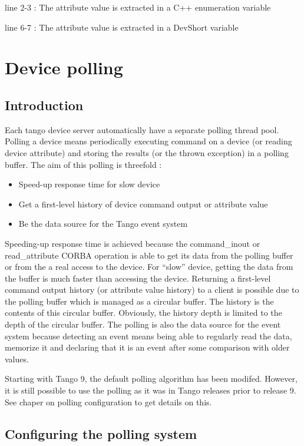 line 2-3 : The attribute value is extracted in a C++ enumeration variable

line 6-7 : The attribute value is extracted in a DevShort variable


\section{Device polling}


\subsection{Introduction}

Each tango device server automatically have a separate polling
thread pool. Polling a device means periodically executing command
on a device (or reading device attribute) and storing the results
(or the thrown exception) in a polling buffer. The aim of this polling
is threefold :
\begin{itemize}
\item Speed-up response time for slow device
\item Get a first-level history of device command output or attribute value
\item Be the data source for the Tango event system
\end{itemize}
Speeding-up response time is achieved because the command\_inout or
read\_attribute CORBA operation is able to get its data from the polling
buffer or from the a real access to the device. For ``slow'' device,
getting the data from the buffer is much faster than accessing the
device. Returning a first-level command output history (or attribute
value history) to a client is possible due to the polling buffer which
is managed as a circular buffer. The history is the contents of this
circular buffer. Obviously, the history depth is limited to the depth
of the circular buffer. The polling is also the data source for the
event system because detecting an event means being able to regularly
read the data, memorize it and declaring that it is an event after
some comparison with older values.

Starting with Tango 9, the default polling algorithm has been modifed.
However, it is still possible to use the polling as it was in Tango
releases prior to release 9. See chaper on polling configuration to
get details on this.


\subsection{Configuring the polling system}


